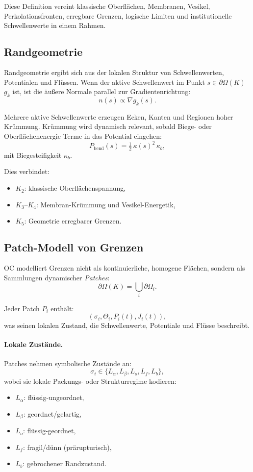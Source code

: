 Diese Definition vereint klassische Oberflächen, Membranen, Vesikel,
Perkolationsfronten, erregbare Grenzen, logische Limiten und institutionelle
Schwellenwerte in einem Rahmen.

\subsection{Randgeometrie}

Randgeometrie ergibt sich aus der lokalen Struktur von Schwellenwerten, Potentialen
und Flüssen.
Wenn der aktive Schwellenwert im Punkt \(s \in \partial\Omega(K)\) \(g_k\) ist, ist die
äußere Normale parallel zur Gradientenrichtung:
\[
  n(s) \propto \nabla g_k(s).
\]

Mehrere aktive Schwellenwerte erzeugen Ecken, Kanten und Regionen hoher Krümmung.
Krümmung wird dynamisch relevant, sobald Biege- oder Oberflächenenergie-Terme
in das Potential eingehen:
\[
  P_{\mathrm{bend}}(s) = \tfrac{1}{2}\,\kappa(s)^2\,\kappa_b,
\]
mit Biegesteifigkeit \(\kappa_b\).

Dies verbindet:
\begin{itemize}
    \item \(K_2\): klassische Oberflächenspannung,
    \item \(K_3\)–\(K_4\): Membran-Krümmung und Vesikel-Energetik,
    \item \(K_5\): Geometrie erregbarer Grenzen.
\end{itemize}

\subsection{Patch-Modell von Grenzen}

OC modelliert Grenzen nicht als kontinuierliche, homogene Flächen, sondern als
Sammlungen dynamischer \emph{Patches}:
\[
  \partial\Omega(K) = \bigcup_i \partial\Omega_i.
\]

Jeder Patch \(P_i\) enthält:
\[
  (\sigma_i,\Theta_i,P_i(t),J_i(t)),
\]
was seinen lokalen Zustand, die Schwellenwerte, Potentiale und Flüsse beschreibt.

\paragraph{Lokale Zustände.}
Patches nehmen symbolische Zustände an:
\[
  \sigma_i \in \{L_\alpha, L_\beta, L_o, L_f, L_b\},
\]
wobei sie lokale Packungs- oder Strukturregime kodieren:
\begin{itemize}
    \item \(L_\alpha\): flüssig-ungeordnet,
    \item \(L_\beta\): geordnet/gelartig,
    \item \(L_o\): flüssig-geordnet,
    \item \(L_f\): fragil/dünn (prärupturisch),
    \item \(L_b\): gebrochener Randzustand.
\end{itemize}

